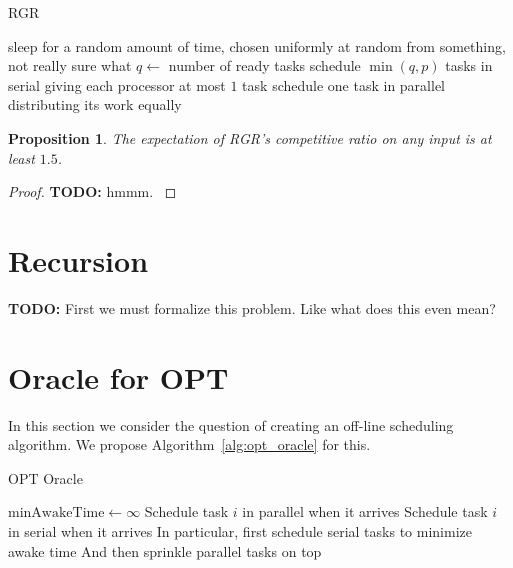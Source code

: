 \documentclass[twocolumn]{article}[10pt]
\newcommand{\todo}[1]{{\color{red}\textbf{TODO:} #1}}
\newtheorem{proposition}{Proposition}
\begin{document}
\begin{algorithm}
  \caption{RGR}
  \label{alg:rgr}
  \begin{algorithmic}
        \State sleep for a random amount of time, chosen
        uniformly at random from something, not really sure what 
        \State $q \gets $ number of ready tasks
          \State schedule $\min(q, p)$ tasks in serial
          \State giving each processor at most $1$ task
        \Else
          \State schedule one task in parallel
          \State distributing its work equally 
        \EndIf
      \EndIf
    \EndWhile
  \end{algorithmic}
\end{algorithm}

\begin{proposition}
  The expectation of RGR's competitive ratio on any input
  is at least $1.5$.
\end{proposition}
\begin{proof}
\todo{
 hmmm. 
 }
\end{proof}


\section{Recursion}
\todo{
First we must formalize this problem. Like what does
this even mean?
}

\section{Oracle for OPT}

In this section we consider the question of creating an off-line
scheduling algorithm. We propose Algorithm~\ref{alg:opt_oracle}
for this.

\begin{algorithm}
  \caption{OPT Oracle}
  \label{alg:opt_oracle}
  \begin{algorithmic}
    \State $\text{minAwakeTime} \gets \infty$
        \State Schedule task $i$ in parallel when it arrives
      \Else
        \State Schedule task $i$ in serial when it arrives
      \EndIf
      \State In particular, first schedule serial tasks to minimize awake time
      \State And then sprinkle parallel tasks on top 

      \EndIf
    \EndFor
  \end{algorithmic}
\end{algorithm}
\end{document}
